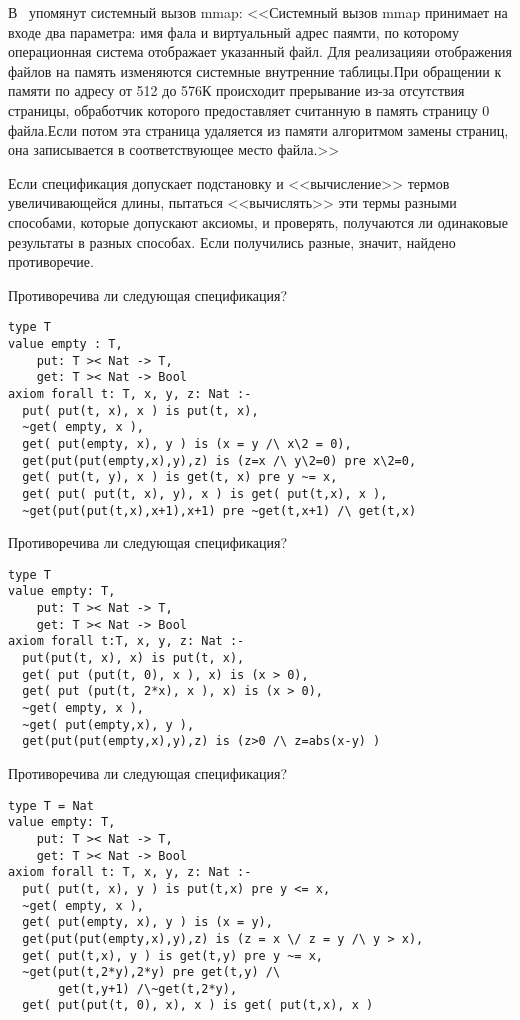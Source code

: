 \z В~\cite{tanenbaum_os} упомянут системный вызов mmap: <<Системный вызов mmap принимает на входе два параметра: имя фала и виртуальный адрес паямти, по которому операционная система отображает указанный файл. Для реализацияи отображения файлов на память изменяются системные внутренние таблицы.При обращении к памяти по адресу от 512 до 576К происходит прерывание из-за отсутствия страницы, обработчик которого предоставляет считанную в память страницу 0 файла.Если потом эта страница удаляется из памяти алгоритмом замены страниц, она записывается в соответствующее место файла.>>


Если спецификация допускает подстановку и <<вычисление>> термов увеличивающейся длины, пытаться <<вычислять>> эти термы разными способами, которые допускают аксиомы, и проверять, получаются ли одинаковые результаты в разных способах. Если получились разные, значит, найдено противоречие.

\z Противоречива ли следующая спецификация?
\begin{lstlisting}
type T
value empty : T,
    put: T >< Nat -> T,
    get: T >< Nat -> Bool
axiom forall t: T, x, y, z: Nat :-
  put( put(t, x), x ) is put(t, x),
  ~get( empty, x ),
  get( put(empty, x), y ) is (x = y /\ x\2 = 0),
  get(put(put(empty,x),y),z) is (z=x /\ y\2=0) pre x\2=0,
  get( put(t, y), x ) is get(t, x) pre y ~= x,
  get( put( put(t, x), y), x ) is get( put(t,x), x ),
  ~get(put(put(t,x),x+1),x+1) pre ~get(t,x+1) /\ get(t,x)
\end{lstlisting}

\z Противоречива ли следующая спецификация?
\begin{lstlisting}
type T
value empty: T,
    put: T >< Nat -> T,
    get: T >< Nat -> Bool
axiom forall t:T, x, y, z: Nat :-
  put(put(t, x), x) is put(t, x),
  get( put (put(t, 0), x ), x) is (x > 0),
  get( put (put(t, 2*x), x ), x) is (x > 0),
  ~get( empty, x ),
  ~get( put(empty,x), y ),
  get(put(put(empty,x),y),z) is (z>0 /\ z=abs(x-y) )
\end{lstlisting}

\z Противоречива ли следующая спецификация?
\begin{lstlisting}
type T = Nat
value empty: T,
    put: T >< Nat -> T,
    get: T >< Nat -> Bool
axiom forall t: T, x, y, z: Nat :-
  put( put(t, x), y ) is put(t,x) pre y <= x,
  ~get( empty, x ),
  get( put(empty, x), y ) is (x = y),
  get(put(put(empty,x),y),z) is (z = x \/ z = y /\ y > x),
  get( put(t,x), y ) is get(t,y) pre y ~= x,
  ~get(put(t,2*y),2*y) pre get(t,y) /\
       get(t,y+1) /\~get(t,2*y),
  get( put(put(t, 0), x), x ) is get( put(t,x), x )
\end{lstlisting}


